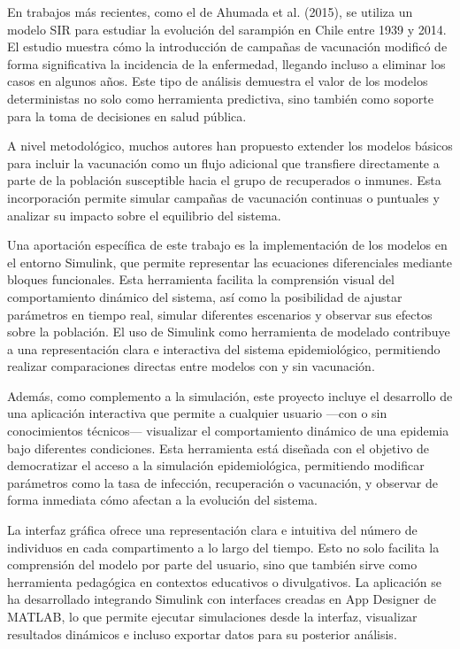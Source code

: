En trabajos más recientes, como el de Ahumada et al. (2015), se utiliza un modelo SIR para estudiar la evolución del sarampión en Chile entre 1939 y 2014. El estudio muestra cómo la introducción de campañas de vacunación modificó de forma significativa la incidencia de la enfermedad, llegando incluso a eliminar los casos en algunos años. Este tipo de análisis demuestra el valor de los modelos deterministas no solo como herramienta predictiva, sino también como soporte para la toma de decisiones en salud pública.

A nivel metodológico, muchos autores han propuesto extender los modelos básicos para incluir la vacunación como un flujo adicional que transfiere directamente a parte de la población susceptible hacia el grupo de recuperados o inmunes. Esta incorporación permite simular campañas de vacunación continuas o puntuales y analizar su impacto sobre el equilibrio del sistema.

Una aportación específica de este trabajo es la implementación de los modelos en el entorno Simulink, que permite representar las ecuaciones diferenciales mediante bloques funcionales. Esta herramienta facilita la comprensión visual del comportamiento dinámico del sistema, así como la posibilidad de ajustar parámetros en tiempo real, simular diferentes escenarios y observar sus efectos sobre la población. El uso de Simulink como herramienta de modelado contribuye a una representación clara e interactiva del sistema epidemiológico, permitiendo realizar comparaciones directas entre modelos con y sin vacunación.

Además, como complemento a la simulación, este proyecto incluye el desarrollo de una aplicación interactiva que permite a cualquier usuario —con o sin conocimientos técnicos— visualizar el comportamiento dinámico de una epidemia bajo diferentes condiciones. Esta herramienta está diseñada con el objetivo de democratizar el acceso a la simulación epidemiológica, permitiendo modificar parámetros como la tasa de infección, recuperación o vacunación, y observar de forma inmediata cómo afectan a la evolución del sistema.

La interfaz gráfica ofrece una representación clara e intuitiva del número de individuos en cada compartimento a lo largo del tiempo. Esto no solo facilita la comprensión del modelo por parte del usuario, sino que también sirve como herramienta pedagógica en contextos educativos o divulgativos. La aplicación se ha desarrollado integrando Simulink con interfaces creadas en App Designer de MATLAB, lo que permite ejecutar simulaciones desde la interfaz, visualizar resultados dinámicos e incluso exportar datos para su posterior análisis.

